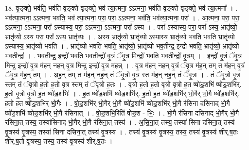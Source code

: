 \documentclass[17pt]{extarticle}
\begin{document}
18. वृ॒ङ्क्ते॒ भव॑ति॒ भव॑ति वृङ्क्ते वृङ्क्ते॒ भव॑ त्या॒त्मना॒ ऽऽत्मना॒ भव॑ति वृङ्क्ते वृङ्क्ते॒ भव॑ त्या॒त्मना᳚ । . भव॑त्या॒त्मना॒ ऽऽत्मना॒ भव॑ति॒ भव॑ त्या॒त्मना॒ परा॒ परा॒ ऽऽत्मना॒ भव॑ति॒ भव॑त्या॒त्मना॒ परा᳚ । . आ॒त्मना॒ परा॒ परा॒ ऽऽत्मना॒ ऽऽत्मना॒ परा᳚ ऽस्यास्य॒ परा॒ ऽऽत्मना॒ ऽऽत्मना॒ परा᳚ ऽस्य । . परा᳚ ऽस्यास्य॒ परा॒ परा᳚ ऽस्य॒ भ्रातृ॑व्यो॒ भ्रातृ॑व्यो ऽस्य॒ परा॒ परा᳚ ऽस्य॒ भ्रातृ॑व्यः । . अ॒स्य॒ भ्रातृ॑व्यो॒ भ्रातृ॑व्यो ऽस्यास्य॒ भ्रातृ॑व्यो भवति भवति॒ भ्रातृ॑व्यो ऽस्यास्य॒ भ्रातृ॑व्यो भवति । . भ्रातृ॑व्यो भवति भवति॒ भ्रातृ॑व्यो॒ भ्रातृ॑व्यो भव॒तीन्द्र॒ इन्द्रो॑ भवति॒ भ्रातृ॑व्यो॒ भ्रातृ॑व्यो भव॒तीन्द्रः॑ । . भ॒व॒तीन्द्र॒ इन्द्रो॑ भवति भव॒तीन्द्रो॑ वृ॒त्रं ॅवृ॒त्र मिन्द्रो॑ भवति भव॒तीन्द्रो॑ वृ॒त्रम् । . इन्द्रो॑ वृ॒त्रं ॅवृ॒त्र मिन्द्र॒ इन्द्रो॑ वृ॒त्र म॑हन् नहन् वृ॒त्र मिन्द्र॒ इन्द्रो॑ वृ॒त्र म॑हन्न् । . वृ॒त्र म॑हन् नहन् वृ॒त्रं ॅवृ॒त्र म॑ह॒न् तम् त म॑हन् वृ॒त्रं ॅवृ॒त्र म॑ह॒न् तम् । . अ॒ह॒न् तम् त म॑हन् नह॒न् तं ॅवृ॒त्रो वृ॒त्र स्त म॑हन् नह॒न् तं ॅवृ॒त्रः । . तं ॅवृ॒त्रो वृ॒त्र स्तम् तं ॅवृ॒त्रो ह॒तो ह॒तो वृ॒त्र स्तम् तं ॅवृ॒त्रो ह॒तः । . वृ॒त्रो ह॒तो ह॒तो वृ॒त्रो वृ॒त्रो ह॒त ष्षो॑ड॒शभि॑ ष्षोड॒शभि॑र्. ह॒तो वृ॒त्रो वृ॒त्रो ह॒त ष्षो॑ड॒शभिः॑ । . ह॒त ष्षो॑ड॒शभि॑ ष्षोड॒शभि॑र्. ह॒तो ह॒त ष्षो॑ड॒शभि॑र् भो॒गैर् भो॒गै ष्षो॑ड॒शभि॑र्. ह॒तो ह॒त ष्षो॑ड॒शभि॑र् भो॒गैः । . षो॒ड॒शभि॑र् भो॒गैर् भो॒गै ष्षो॑ड॒शभि॑ ष्षोड॒शभि॑र् भो॒गै र॑सिना दसिनाद् भो॒गै ष्षो॑ड॒शभि॑ ष्षोड॒शभि॑र् भो॒गै र॑सिनात् । . षो॒ड॒शभि॒रिति॑ षोड॒श - भिः॒ । . भो॒गै र॑सिना दसिनाद् भो॒गैर् भो॒गै र॑सिना॒त् तस्य॒ तस्या॑सिनाद् भो॒गैर् भो॒गै र॑सिना॒त् तस्य॑ । . अ॒सि॒ना॒त् तस्य॒ तस्या॑ सिना दसिना॒त् तस्य॑ वृ॒त्रस्य॑ वृ॒त्रस्य॒ तस्या॑ सिना दसिना॒त् तस्य॑ वृ॒त्रस्य॑ । . तस्य॑ वृ॒त्रस्य॑ वृ॒त्रस्य॒ तस्य॒ तस्य॑ वृ॒त्रस्य॑ शीर्.ष॒तः शी॑र्.ष॒तो वृ॒त्रस्य॒ तस्य॒ तस्य॑ वृ॒त्रस्य॑ शीर्.ष॒तः । \newline
\end{document}

